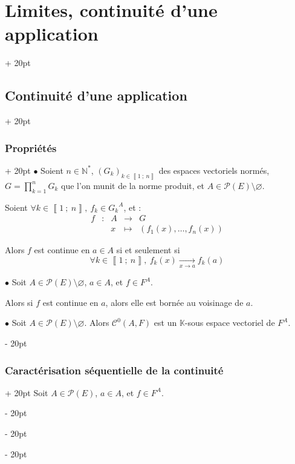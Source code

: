 \documentclass[a4paper, 12pt, twoside]{article}
\newcommand{\N}{\mathbb{N}} %
\newcommand{\K}{\mathbb K}
\newcommand{\nset}[2]{\left\llbracket #1\ ;\ #2 \right\rrbracket}
\newcommand{\tendsto}[1]{\xrightarrow[#1]{}}
\newcommand{\lr}[1]{\left( #1 \right)}
\newcommand{\ind}[1][20pt]{\advance\leftskip + #1}
\newcommand{\deind}[1][20pt]{\advance\leftskip - #1}
\newenvironment{indt}[2][20pt]{#2 \par \ind[#1]}{\par \deind} %
\begin{document}
\begin{indt}{\section{Limites, continuité d'une application}}
\begin{indt}{\subsection{Continuité d'une application}}
            \vspace{12pt}
            
            \begin{indt}{\subsubsection{Propriétés}}
                $\bullet$ Soient $n \in \N^*$, $(G_k)_{k \in \nset 1 n}$ des espaces vectoriels normés, $\displaystyle G = \prod_{k = 1}^n G_k$ que l'on munit de la norme produit, et $A \in \mathcal P(E) \setminus \varnothing$.

                Soient $\forall k \in \nset 1 n,\ f_k \in {G_k}^A$, et :
                \[
                    \begin{array}{ccccc}
                        f & : & A & \longrightarrow & G
                        \\
                          && x & \longmapsto & \lr{f_1(x), \ldots, f_n(x)}
                    \end{array}
                \]

                Alors $f$ est continue en $a \in A$ si et seulement si
                \[
                    \forall k \in \nset 1 n,\
                    f_k(x) \tendsto{x \to a} f_k(a)
                \]

                \vspace{12pt}
                
                $\bullet$ Soit $A \in \mathcal P(E) \setminus \varnothing$, $a \in A$, et $f \in F^A$.

                Alors si $f$ est continue en $a$, alors elle est bornée au voisinage de $a$.

                \vspace{12pt}
                
                $\bullet$ Soit $A \in \mathcal P(E) \setminus \varnothing$. Alors $\mathcal C^0(A, F)$ est un $\K$-sous espace vectoriel de $F^A$.
            \end{indt}

            \vspace{12pt}
            
            \begin{indt}{\subsubsection{Caractérisation séquentielle de la continuité}}
                Soit $A \in \mathcal P(E)$, $a \in A$, et $f \in F^A$.


\end{indt}
\end{indt}
\end{indt}
\end{document}
